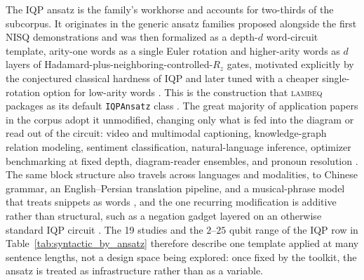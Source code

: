 \documentclass{ieeeaccess}
\begin{document}
The IQP ansatz is the family's workhorse and accounts for two-thirds of the subcorpus. It originates in the generic ansatz families proposed alongside the first NISQ demonstrations and was then formalized as a depth-$d$ word-circuit template, arity-one words as a single Euler rotation and higher-arity words as $d$ layers of Hadamard-plus-neighboring-controlled-$R_z$ gates, motivated explicitly by the conjectured classical hardness of IQP and later tuned with a cheaper single-rotation option for low-arity words \cite{meichanetzidis_quantum_2021,meichanetzidis_grammar-aware_2023,lorenz_qnlp_2023}. This is the construction that \textsc{lambeq} packages as its default \texttt{IQPAnsatz} class \cite{kartsaklis_lambeq_2021}. The great majority of application papers in the corpus adopt it unmodified, changing only what is fed into the diagram or read out of the circuit: video and multimodal captioning, knowledge-graph relation modeling, sentiment classification, natural-language inference, optimizer benchmarking at fixed depth, diagram-reader ensembles, and pronoun resolution \cite{r_quantum_2023,hawashin_compositional_2025,bharti_quantum_2025,ganguly_quantum_2022,naik_extending_2026,sun_quantum_2026,rajashekharaiah_sentence_2023,ruskanda_enhancing_2024,bouakba_ensemble_2023,wazni_quantum_2022,wazni_large_2024}. The same block structure also travels across languages and modalities, to Chinese grammar, an English--Persian translation pipeline, and a musical-phrase model that treats snippets as words \cite{balthasar_mansky_adapting_2023,abbaszadeh_hybrid_2026,miranda_quantum_2022}, and the one recurring modification is additive rather than structural, such as a negation gadget layered on an otherwise standard IQP circuit \cite{ruskanda_quantum_2022}. The 19 studies and the $2$--$25$ qubit range of the IQP row in Table~\ref{tab:syntactic_by_ansatz} therefore describe one template applied at many sentence lengths, not a design space being explored: once fixed by the toolkit, the ansatz is treated as infrastructure rather than as a variable.
\end{document}
